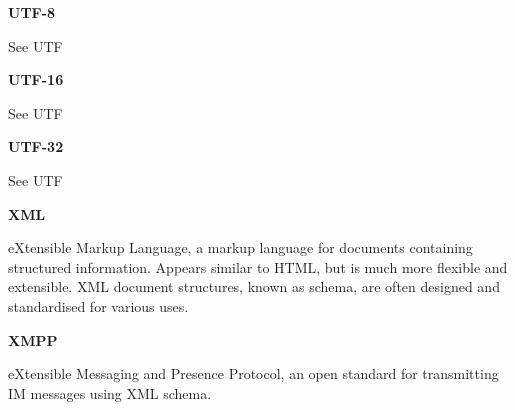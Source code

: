 \textbf{UTF-8}

See UTF

\textbf{UTF-16}

See UTF

\textbf{UTF-32}

See UTF

\textbf{XML}

eXtensible Markup Language, a markup language for documents containing
structured information. Appears similar to HTML, but is much more
flexible and extensible. XML document structures, known as schema, are
often designed and standardised for various uses.

\textbf{XMPP}

eXtensible Messaging and Presence Protocol, an open standard for
transmitting IM messages using XML schema.
